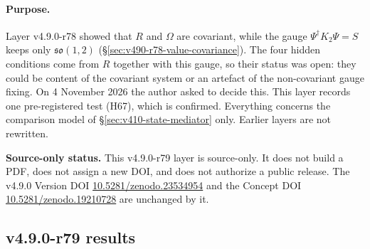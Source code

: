 \paragraph{Purpose.}
Layer v4.9.0-r78 showed that \(R\) and \(\Omega\) are covariant, while the gauge \(\Psi^\dagger K_2\Psi=S\) keeps only
\(\mathfrak{so}(1,2)\) (\S\ref{sec:v490-r78-value-covariance}).  The four hidden conditions come from \(R\) together with this
gauge, so their status was open: they could be content of the covariant system or an artefact of the non-covariant gauge
fixing.  On 4 November 2026 the author asked to decide this.  This layer records one pre-registered test (H67), which is
confirmed.  Everything concerns the comparison model of \S\ref{sec:v410-state-mediator} only.  Earlier layers are not
rewritten.

\noindent\textbf{Source-only status.}
This v4.9.0-r79 layer is source-only.  It does not build a PDF, does not assign a new DOI,
and does not authorize a public release.  The v4.9.0 Version DOI
\href{https://doi.org/10.5281/zenodo.23534954}{10.5281/zenodo.23534954} and the Concept DOI
\href{https://doi.org/10.5281/zenodo.19210728}{10.5281/zenodo.19210728} are unchanged by it.

\subsection*{v4.9.0-r79 results}
\label{subsec:v490-r79-results}

